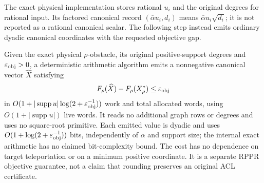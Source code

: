 The exact physical implementation stores rational $u_i$ and the original
degrees for rational input. Its factored canonical record
$(\bar\alpha u_i,d_i)$ means $\bar\alpha u_i\sqrt{d_i}$; it is not
reported as a rational canonical scalar. The following step instead emits
ordinary dyadic canonical coordinates with the requested objective gap.

\begin{theorem}
\label{thm:op3-rational-canonical-materialization}
Given the exact physical $\rho$-obstacle, its original positive-support
degrees and $\varepsilon_{\mathrm{obj}}>0$, a deterministic arithmetic algorithm emits a
nonnegative canonical vector $\widehat X$ satisfying
\[
 F_\rho(\widehat X)-F_\rho(X_\rho^*)\leq\varepsilon_{\mathrm{obj}}
\]
in $O(1+|\operatorname{supp}u|\log(2+\varepsilon_{\mathrm{obj}}^{-1}))$ work and total
allocated words, using $O(1+|\operatorname{supp}u|)$ live words. It reads
no additional graph rows or degrees and uses no square-root primitive.
Each emitted value is dyadic and uses
$O(1+\log(2+\varepsilon_{\mathrm{obj}}^{-1}))$ bits, independently of $\alpha$ and support size;
the internal exact arithmetic has no claimed bit-complexity bound.
The cost has no dependence on target teleportation or on a minimum positive
coordinate. It is a separate RPPR objective guarantee, not a claim that
rounding preserves an original ACL certificate.
\end{theorem}
